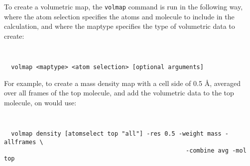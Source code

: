 To create a volumetric map, the {\tt volmap} command is run in the following
way, where the atom selection specifies the atoms and molecule to include in the
calculation, and where the maptype specifies the type of volumetric data to
create:
{\tt 
\begin{verbatim}
  volmap <maptype> <atom selection> [optional arguments]
\end{verbatim}
}

For example, to create a mass density map with a cell side of 0.5 {\AA},
averaged over all frames of the top molecule, and add the volumetric data to the
top molecule, on would use:
{\tt 
\begin{verbatim}
  volmap density [atomselect top "all"] -res 0.5 -weight mass -allframes \
                                                   -combine avg -mol top
\end{verbatim}
}

